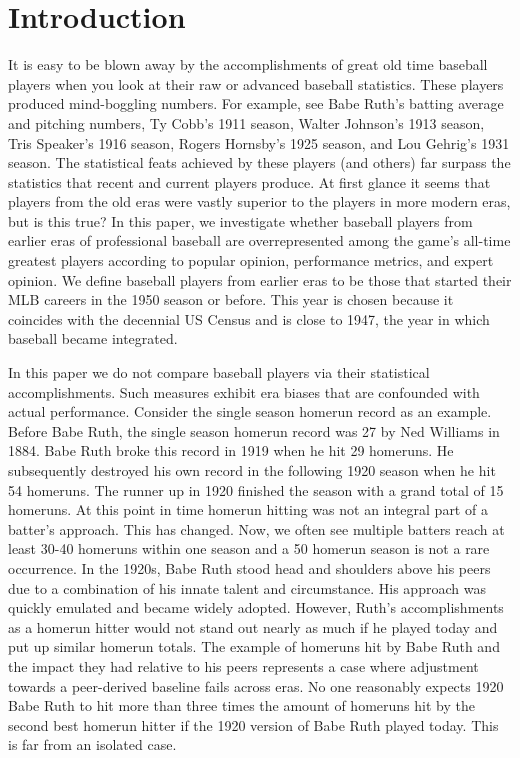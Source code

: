 \documentclass[11pt]{article}\usepackage[]{graphicx}\usepackage[]{color}
\begin{document}
\section{Introduction}
\doublespacing
It is easy to be blown away by the accomplishments of great old time 
baseball players when you look at their raw or advanced baseball statistics.  
These players produced mind-boggling numbers. For example, see 
Babe Ruth's batting average and pitching numbers, 
Ty Cobb's 1911 season, 
Walter Johnson's 1913 season, 
Tris Speaker's 1916 season, 
Rogers Hornsby's 1925 season, 
and
Lou Gehrig's 1931 season.
The statistical feats achieved by these players (and others) far surpass 
the statistics that recent and current players produce.  At first glance 
it seems that players from the old eras were vastly superior to the 
players in more modern eras, but is this true? 
In this paper, we investigate whether baseball players from earlier 
eras of professional baseball are overrepresented among the game's all-time 
greatest players according to popular opinion, performance metrics, and expert 
opinion.  We define baseball players from earlier eras to be those that 
started their MLB careers in the 1950 season or before.  
This year is chosen because it coincides with the decennial US Census 
and is close to 1947, the year in which baseball became integrated. 

In this paper we do not compare baseball players via their statistical 
accomplishments.  Such measures exhibit era biases that are confounded with 
actual performance.  Consider the single season homerun record as an example. 
Before Babe Ruth, the single season homerun record was 27 by Ned Williams in 
1884. %
Babe Ruth broke this record in 1919 
when he hit 29 homeruns.  He subsequently destroyed his own record in 
the following 1920 season when he hit 54 homeruns.  The runner up in 1920 
finished the season with a grand total of 15 homeruns.  At this point in time 
homerun hitting was not an integral part of a batter's approach. %
This has changed. Now, we often see multiple batters reach at least 30-40 
homeruns within one season and a 50 homerun season is not a rare 
occurrence. %
In the 1920s, Babe Ruth stood head and shoulders above his peers due to a 
combination of his innate talent and circumstance.  
His approach was quickly emulated and became widely adopted. %
However, Ruth's accomplishments as a homerun hitter would not stand out nearly 
as much if he played today and put up similar homerun totals.    
The example of homeruns hit by Babe Ruth and the impact they had relative 
to his peers represents a case where adjustment towards a peer-derived 
baseline fails across eras.  No one reasonably expects 1920 Babe Ruth to hit 
more than three times the amount of homeruns hit by the second best homerun 
hitter if the 1920 version of Babe Ruth played today.  
This is far from an isolated case.  
\end{document}
